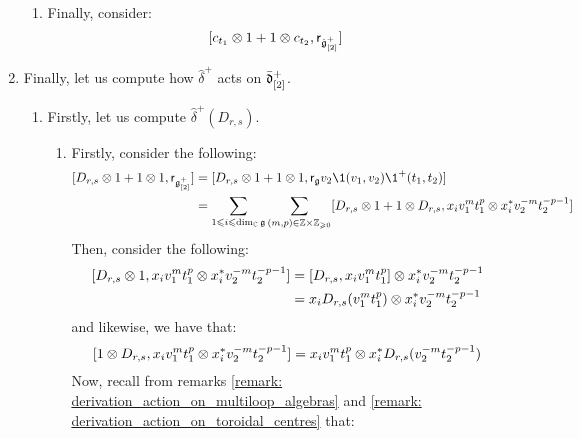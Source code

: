 \begin{remark}
\begin{enumerate}
\begin{enumerate}
                        \item Finally, consider:
                            $$[c_{t_1} \tensor 1 + 1 \tensor c_{t_2}, \sfr_{\hat{\g}_{[2]}^+}]$$
                    \end{enumerate}

                    \item Finally, let us compute how $\hat{\delta}^+$ acts on $\bar{\mathfrak{d}}_{[2]}^+$. 
                    \begin{enumerate}
                        \item Firstly, let us compute $\hat{\delta}^+(D_{r, s})$. 
                        \begin{enumerate}
                            \item Firstly, consider the following:
                                $$
                                    \begin{aligned}
                                        [D_{r, s} \tensor 1 + 1 \tensor 1, \sfr_{\g_{[2]}^+}] & = [D_{r, s} \tensor 1 + 1 \tensor 1, \sfr_{\g} v_2 \1(v_1, v_2) \1^+(t_1, t_2)]
                                        \\
                                        & = \sum_{1 \leq i \leq \dim_{\bbC} \g} \sum_{(m, p) \in \Z \x \Z_{\geq 0}} [D_{r, s} \tensor 1 + 1 \tensor D_{r, s}, x_i v_1^m t_1^p \tensor x_i^* v_2^{-m} t_2^{-p - 1}]
                                    \end{aligned}
                                $$
                            Then, consider the following:
                                $$
                                    \begin{aligned}
                                        [D_{r, s} \tensor 1, x_i v_1^m t_1^p \tensor x_i^* v_2^{-m} t_2^{-p - 1}] & = [D_{r, s}, x_i v_1^m t_1^p] \tensor x_i^* v_2^{-m} t_2^{-p - 1}
                                        \\
                                        & = x_i D_{r, s}(v_1^m t_1^p) \tensor x_i^* v_2^{-m} t_2^{-p - 1}
                                    \end{aligned}
                                $$
                            and likewise, we have that:
                                $$[1 \tensor D_{r, s}, x_i v_1^m t_1^p \tensor x_i^* v_2^{-m} t_2^{-p - 1}] = x_i v_1^m t_1^p \tensor x_i^* D_{r, s}(v_2^{-m} t_2^{-p - 1})$$
                            Now, recall from remarks \ref{remark: derivation_action_on_multiloop_algebras} and \ref{remark: derivation_action_on_toroidal_centres} that:

\end{enumerate}
\end{enumerate}
\end{enumerate}
\end{remark}
